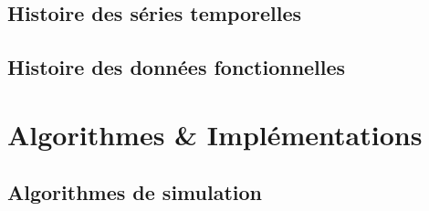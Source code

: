 \section{ Histoire des séries temporelles }

\pagebreak
\section{ Histoire des données fonctionnelles }

\pagebreak
% 


\chapter{Algorithmes \& Implémentations}

\label{annexe:code}
\section{Algorithmes de simulation}



%

